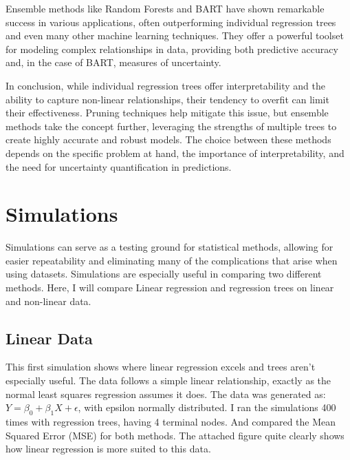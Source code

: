 \documentclass[12pt]{article}
\begin{document}
Ensemble methods like Random Forests and BART have shown remarkable success in various applications, often outperforming individual regression trees and even many other machine learning techniques. They offer a powerful toolset for modeling complex relationships in data, providing both predictive accuracy and, in the case of BART, measures of uncertainty.

In conclusion, while individual regression trees offer interpretability and the ability to capture non-linear relationships, their tendency to overfit can limit their effectiveness. Pruning techniques help mitigate this issue, but ensemble methods take the concept further, leveraging the strengths of multiple trees to create highly accurate and robust models. The choice between these methods depends on the specific problem at hand, the importance of interpretability, and the need for uncertainty quantification in predictions.


\section{Simulations}

Simulations can serve as a testing ground for statistical methods, allowing for easier repeatability and eliminating many of the complications that arise when using datasets. Simulations are especially useful in comparing two different methods. Here, I will compare Linear regression and regression trees on linear and non-linear data.


\subsection{Linear Data}

This first simulation shows where linear regression excels and trees aren't especially useful. The data follows a simple linear relationship, exactly as the normal least squares regression assumes it does. The data was generated as: $Y = \beta_0 + \beta_1X + \epsilon$, with epsilon normally distributed. I ran the simulations 400 times with regression trees, having 4 terminal nodes. And compared the Mean Squared Error (MSE) for both methods. The attached figure quite clearly shows how linear regression is more suited to this data.
\end{document}
